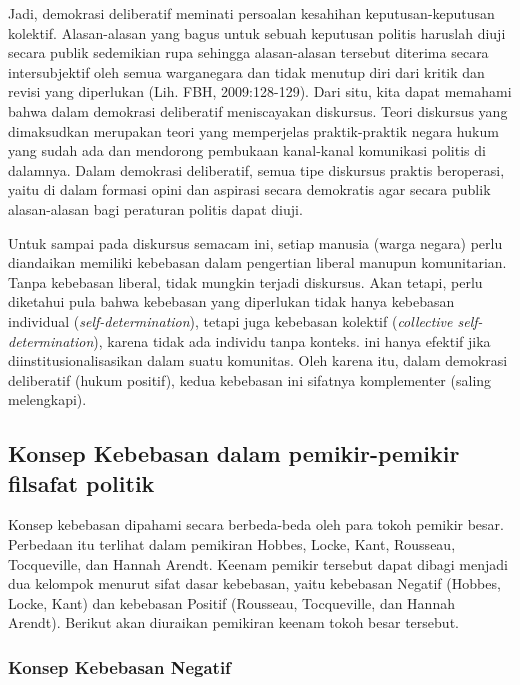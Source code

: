 \documentclass[11pt,twoside,a5paper,openany]{memoir}
\begin{document}
Jadi, demokrasi deliberatif meminati persoalan kesahihan
keputusan-keputusan kolektif. Alasan-alasan yang bagus untuk sebuah
keputusan politis haruslah diuji secara publik sedemikian rupa sehingga
alasan-alasan tersebut diterima secara intersubjektif oleh semua
warganegara dan tidak menutup diri dari kritik dan revisi yang
diperlukan (Lih. FBH, 2009:128-129). Dari situ, kita dapat memahami
bahwa dalam demokrasi deliberatif meniscayakan diskursus. Teori
diskursus yang dimaksudkan merupakan teori yang memperjelas
praktik-praktik negara hukum yang sudah ada dan mendorong pembukaan
kanal-kanal komunikasi politis di dalamnya. Dalam demokrasi deliberatif,
semua tipe diskursus praktis beroperasi, yaitu di dalam formasi opini
dan aspirasi secara demokratis agar secara publik alasan-alasan bagi
peraturan politis dapat diuji.

Untuk sampai pada diskursus semacam ini, setiap manusia (warga negara)
perlu diandaikan memiliki kebebasan dalam pengertian liberal manupun
komunitarian. Tanpa kebebasan liberal, tidak mungkin terjadi diskursus.
Akan tetapi, perlu diketahui pula bahwa kebebasan yang diperlukan tidak
hanya kebebasan individual (\emph{self-determination}), tetapi juga
kebebasan kolektif (\emph{collective self-determination}), karena tidak
ada individu tanpa konteks. ini hanya efektif jika
diinstitusionalisasikan dalam suatu komunitas. Oleh karena itu, dalam
demokrasi deliberatif (hukum positif), kedua kebebasan ini sifatnya
komplementer (saling melengkapi).

\hypertarget{konsep-kebebasan-dalam-pemikir-pemikir-filsafat-politik}{%
\subsection{Konsep Kebebasan dalam pemikir-pemikir filsafat
politik}\label{konsep-kebebasan-dalam-pemikir-pemikir-filsafat-politik}}

Konsep kebebasan dipahami secara berbeda-beda oleh para tokoh pemikir
besar. Perbedaan itu terlihat dalam pemikiran Hobbes, Locke, Kant,
Rousseau, Tocqueville, dan Hannah Arendt. Keenam pemikir tersebut dapat
dibagi menjadi dua kelompok menurut sifat dasar kebebasan, yaitu
kebebasan Negatif (Hobbes, Locke, Kant) dan kebebasan Positif (Rousseau,
Tocqueville, dan Hannah Arendt). Berikut akan diuraikan pemikiran keenam
tokoh besar tersebut.

\hypertarget{konsep-kebebasan-negatif}{%
\subsubsection{Konsep Kebebasan
Negatif}\label{konsep-kebebasan-negatif}}
\end{document}
